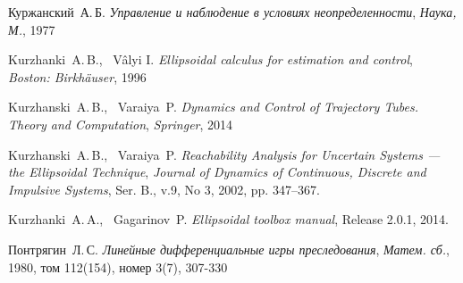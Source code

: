 \begin{thebibliography}{0}

	 Куржанский~А.\,Б. 
	\emph{Управление и наблюдение в условиях неопределенности}, \emph{Наука, М.}, 1977

	 Kurzhanki~A.\,B., \ Vâlyi I.
	\emph{Ellipsoidal calculus for estimation and control}, \emph{Boston: Birkhäuser}, 1996

	 Kurzhanski~A.\,B., \ Varaiya~P. 
	\emph{Dynamics and Control of Trajectory Tubes. Theory and Computation}, \emph{Springer}, 2014

	 Kurzhanski~A.\,B., \ Varaiya~P. 
	\emph{Reachability Analysis for Uncertain Systems — the Ellipsoidal Technique}, \emph{Journal of Dynamics of Continuous, Discrete and Impulsive Systems}, Ser. B., v.9, No 3, 2002, pp. 347–367.

	 Kurzhanki~A.\,A., \ Gagarinov~P. 
	\emph{Ellipsoidal toolbox manual}, Release 2.0.1, 2014.

	 Понтрягин~Л.\,С.
	\emph{Линейные дифференциальные игры преследования}, \emph{Матем. сб.}, 1980, том 112(154), номер 3(7), 307-330

\end{thebibliography}